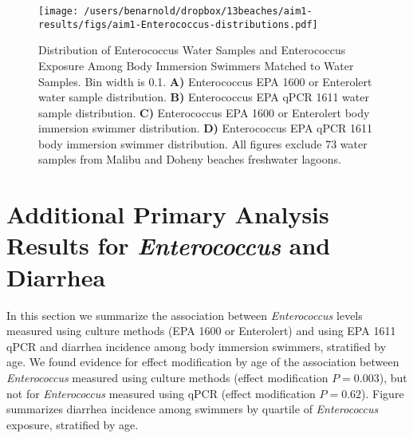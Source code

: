 \documentclass[12pt]{article}\usepackage[]{graphicx}\usepackage[]{color}
\begin{document}
\begin{figure}
\begin{center}
\texttt{[image: /users/benarnold/dropbox/13beaches/aim1-results/figs/aim1-Enterococcus-distributions.pdf]}
\caption{Distribution of Enterococcus Water Samples and Enterococcus Exposure Among Body Immersion Swimmers Matched to Water Samples. Bin width is 0.1.  \textbf{A)} Enterococcus EPA 1600 or Enterolert water sample distribution. \textbf{B)} Enterococcus EPA qPCR 1611 water sample distribution. \textbf{C)} Enterococcus EPA 1600 or Enterolert body immersion swimmer distribution. \textbf{D)} Enterococcus EPA qPCR 1611 body immersion swimmer distribution.  All figures exclude 73 water samples from Malibu and Doheny beaches freshwater lagoons.
\label{fig:enterodist}}
\end{center}
\end{figure}

\clearpage
\section{Additional Primary Analysis Results for \emph{Enterococcus} and Diarrhea}

In this section we summarize the association between \emph{Enterococcus} levels measured using culture methods (EPA 1600 or Enterolert) and using EPA 1611 qPCR and diarrhea incidence among body immersion swimmers, stratified by age.  We found evidence for effect modification by age of the association between \textit{Enterococcus} measured using culture methods (effect modification $P=0.003$), but not for \textit{Enterococcus} measured using qPCR (effect modification $P=0.62$).  Figure  \label{fig:enteroage} summarizes diarrhea incidence among swimmers by quartile of \textit{Enterococcus} exposure, stratified by age.
\end{document}
